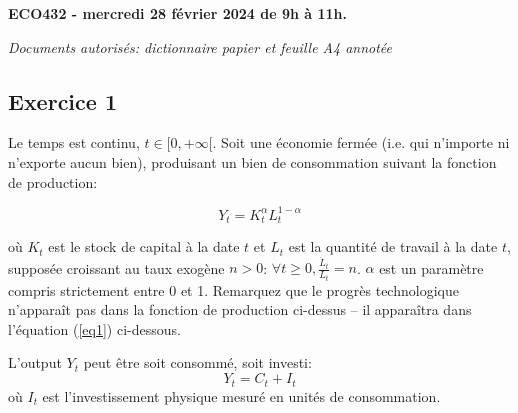 \documentclass{article}
\author{}
\date{}
\begin{document}
\begin{center}
    \textbf{ECO432 - mercredi 28 février 2024 de 9h à 11h.}


\end{center}

\begin{center}

\textit{Documents autorisés: dictionnaire papier et feuille A4 annotée}

\end{center}
\bigskip
\bigskip


\hypertarget{exercice-1}{\subsection{Exercice 1}\label{exercice-1}}


Le temps est continu, $t \in [0, +\infty[$. Soit une économie fermée (i.e. qui n’importe ni n’exporte aucun bien), produisant un bien de consommation suivant la fonction de production:

\begin{equation}\label{eq0} Y_t = K_t^{\alpha} L_t^{1-\alpha} \end{equation}

où \( K_t \) est le stock de capital à la date \( t \) et \( L_t \) est la quantité de travail à la date \( t \), supposée croissant au taux exogène \( n > 0 \): \( \forall t \geq 0, \frac{\dot{L}_t}{L_t} = n \). \( \alpha \) est un paramètre compris strictement entre 0 et 1.  Remarquez que le progrès technologique n'apparaît pas dans la fonction de production ci-dessus -- il apparaîtra dans l'équation (\ref{eq1}) ci-dessous.

L'output $Y_t$ peut être soit consommé, soit investi:
\begin{equation}Y_t=C_t+I_t \end{equation} où $I_t$ est l'investissement physique mesuré en unités de consommation. 


\end{document}
